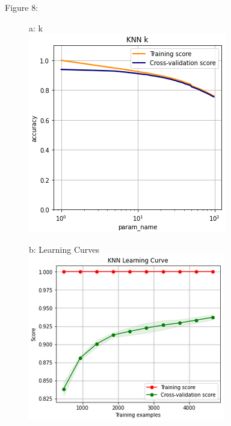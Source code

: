 \documentclass{article}
\begin{document}
\begin{figure}
	\centering
	Figure 8:\\
	\begin{subfigure}{.30\textwidth}
		\centering
		a: k\\
		\includegraphics[width=\linewidth]{mnist_knn_k.png}
		
	\end{subfigure}
	\begin{subfigure}{.34\textwidth}
		\centering
		b: Learning Curves\\
		\includegraphics[width=\linewidth]{mnist_knn_learning.png}
		

\end{subfigure}
\end{figure}
\end{document}
